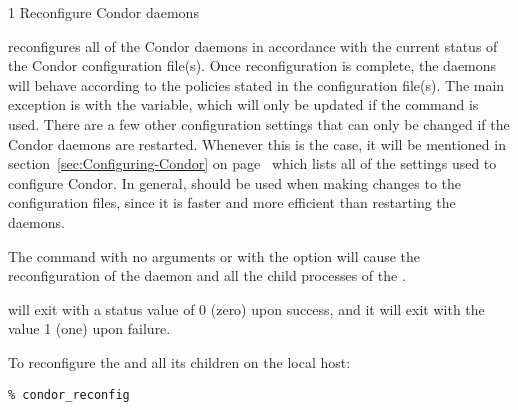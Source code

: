 \begin{ManPage}{\label{man-condor-reconfig}}{1}
{Reconfigure Condor daemons}
\Synopsis {}
\ToolArgsBase

\ToolDebugOption
\ToolArgsLocate
\ToolArgsAffect
{}

\ToolDebugOption
\ToolWhere
\ToolArgsAffect
{}


\Description 

 reconfigures all of the Condor daemons in accordance with 
the current
status of the Condor configuration file(s).  
Once reconfiguration is complete, the daemons will behave according to
the policies stated in the configuration file(s).
The main exception is with the  variable,
which will only be
updated if the  command is used.  
There are a few other configuration settings that can only be changed
if the Condor daemons are restarted.
Whenever this is the case, it will be mentioned in
section~\ref{sec:Configuring-Condor} on
page~\pageref{sec:Configuring-Condor} which lists all of the settings
used to configure Condor. 
In general,  should be used when making changes to
the configuration files, since it is faster and more efficient than
restarting the daemons.

The command 
with no arguments or with the  option 
will cause the reconfiguration of the 
daemon and all the child processes of the .


\begin{Options}
    \ToolArgsBaseDesc
    \ToolDebugDesc
    \ToolArgsLocateDesc
    \ToolArgsAffectDesc
\end{Options}

\ExitStatus

 will exit with a status value of 0 (zero) upon success,
and it will exit with the value 1 (one) upon failure.

\Examples
To reconfigure the  and all its children
on the local host:
\begin{verbatim}
% condor_reconfig
\end{verbatim}


\end{ManPage}
